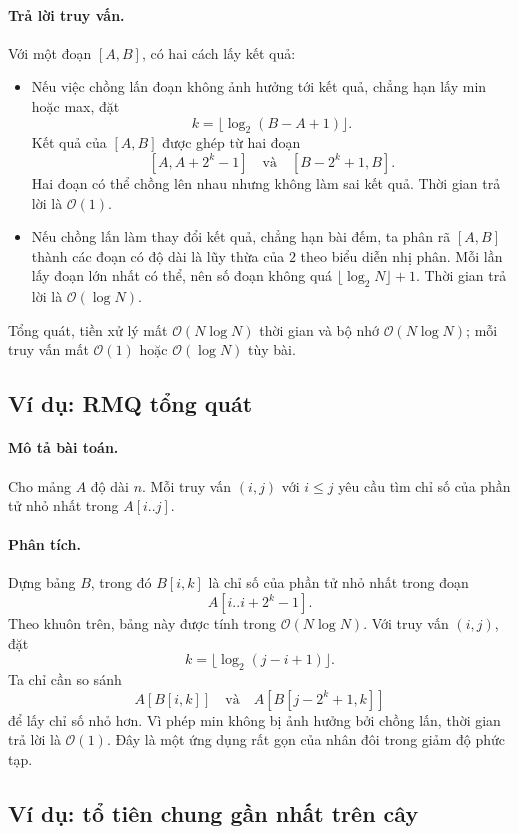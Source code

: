 \documentclass[11pt]{article}
\newcommand{\Oh}{\mathcal{O}}
\begin{document}
\paragraph{Trả lời truy vấn.}
Với một đoạn $[A,B]$, có hai cách lấy kết quả:
\begin{itemize}
  \item Nếu việc chồng lấn đoạn không ảnh hưởng tới kết quả, chẳng hạn lấy
  min hoặc max, đặt
  \[
    k=\lfloor \log_2(B-A+1)\rfloor.
  \]
  Kết quả của $[A,B]$ được ghép từ hai đoạn
  \[
    [A,A+2^k-1]\quad\text{và}\quad [B-2^k+1,B].
  \]
  Hai đoạn có thể chồng lên nhau nhưng không làm sai kết quả. Thời gian trả
  lời là $\Oh(1)$.

  \item Nếu chồng lấn làm thay đổi kết quả, chẳng hạn bài đếm, ta phân rã
  $[A,B]$ thành các đoạn có độ dài là lũy thừa của $2$ theo biểu diễn nhị
  phân. Mỗi lần lấy đoạn lớn nhất có thể, nên số đoạn không quá
  $\lfloor\log_2 N\rfloor+1$. Thời gian trả lời là $\Oh(\log N)$.
\end{itemize}

Tổng quát, tiền xử lý mất $\Oh(N\log N)$ thời gian và bộ nhớ
$\Oh(N\log N)$; mỗi truy vấn mất $\Oh(1)$ hoặc $\Oh(\log N)$ tùy bài.

\subsection{Ví dụ: RMQ tổng quát}

\paragraph{Mô tả bài toán.}
Cho mảng $A$ độ dài $n$. Mỗi truy vấn $(i,j)$ với $i\le j$ yêu cầu tìm chỉ số
của phần tử nhỏ nhất trong $A[i..j]$.

\paragraph{Phân tích.}
Dựng bảng $B$, trong đó $B[i,k]$ là chỉ số của phần tử nhỏ nhất trong đoạn
\[
  A[i..i+2^k-1].
\]
Theo khuôn trên, bảng này được tính trong $\Oh(N\log N)$. Với truy vấn
$(i,j)$, đặt
\[
  k=\lfloor \log_2(j-i+1)\rfloor.
\]
Ta chỉ cần so sánh
\[
  A[B[i,k]]
  \quad\text{và}\quad
  A[B[j-2^k+1,k]]
\]
để lấy chỉ số nhỏ hơn. Vì phép min không bị ảnh hưởng bởi chồng lấn, thời gian
trả lời là $\Oh(1)$. Đây là một ứng dụng rất gọn của nhân đôi trong giảm độ
phức tạp.

\subsection{Ví dụ: tổ tiên chung gần nhất trên cây}
\end{document}
